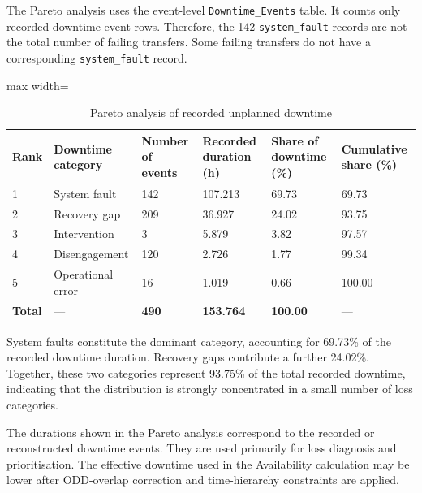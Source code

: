 The Pareto analysis uses the event-level \texttt{Downtime\_Events} table. It counts only recorded downtime-event rows. Therefore, the 142 \texttt{system\_fault} records are not the total number of failing transfers. Some failing transfers do not have a corresponding \texttt{system\_fault} record.
\begin{table}[H]
\small
\renewcommand{\arraystretch}{1.3}
\centering
\caption{Pareto analysis of recorded unplanned downtime}
\label{tab:pareto-recorded-unplanned-downtime}
\begin{adjustbox}{max width=\textwidth}
\begin{tabular}{|p{1.0cm}|p{4.0cm}|p{2.6cm}|p{2.8cm}|p{2.6cm}|p{2.8cm}|}
\hline
\textbf{Rank} & \textbf{Downtime category} & \textbf{Number of events} & \textbf{Recorded duration (h)} & \textbf{Share of downtime (\%)} & \textbf{Cumulative share (\%)} \\
\hline
1 & System fault & 142 & 107.213 & 69.73 & 69.73 \\
\hline
2 & Recovery gap & 209 & 36.927 & 24.02 & 93.75 \\
\hline
3 & Intervention & 3 & 5.879 & 3.82 & 97.57 \\
\hline
4 & Disengagement & 120 & 2.726 & 1.77 & 99.34 \\
\hline
5 & Operational error & 16 & 1.019 & 0.66 & 100.00 \\
\hline
\textbf{Total} & --- & \textbf{490} & \textbf{153.764} & \textbf{100.00} & --- \\
\hline
\end{tabular}
\end{adjustbox}
\end{table}

System faults constitute the dominant category, accounting for 69.73\% of the recorded downtime duration. Recovery gaps contribute a further 24.02\%. Together, these two categories represent 93.75\% of the total recorded downtime, indicating that the distribution is strongly concentrated in a small number of loss categories.

The durations shown in the Pareto analysis correspond to the recorded or reconstructed downtime events. They are used primarily for loss diagnosis and prioritisation. The effective downtime used in the Availability calculation may be lower after ODD-overlap correction and time-hierarchy constraints are applied.

